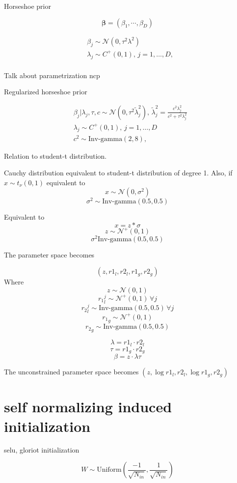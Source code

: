\documentclass[]{report}
\begin{document}
Horseshoe prior \cite{piironen2017sparsity}

\[ \mathbf{\beta} = (\beta_1,\cdots,\beta_D)\]

\begin{align*}
 &\beta_j \sim \mathcal{N}(0,\tau^2\lambda^2) \\
 &\lambda_j \sim C^+(0,1),\, j = 1,\dots , D, \\
\end{align*}

Talk about parametrization ncp 

Regularized horseshoe prior 

\begin{align*}
&\beta_j | \lambda_j, \tau, c \sim \mathcal{N}(0,\tau^2 \tilde{\lambda}_j^2) ,\, \tilde{\lambda}_j^2 = \frac{c^2 \lambda_j^2}{c^2 + \tau^2 \lambda_j^2} \\
&\lambda_j \sim C^+(0,1),\, j = 1,\dots,D\\
&c^2 \sim \text{Inv-gamma}(2,8) ,
\end{align*}

Relation to student-t distribution. 

Cauchy distribution equivalent to student-t distribution of degree 1. Also, if $x \sim t_{\nu}(0,1) $ 
equivalent to 
\[ x \sim \mathcal{N}(0,\sigma^2)\]
\[\sigma^2 \sim \text{Inv-gamma}(0.5,0.5) \]

Equivalent to 
\[ x = z * \sigma \]
\[ z \sim \mathcal{N}^+(0,1)\]
\[\sigma^2 \text{Inv-gamma}(0.5,0.5) \]

The parameter space becomes 

\[(z,r1_l,r2_l,r1_g,r2_g) \]
Where
\[ z \sim \mathcal{N}(0,1) \]
\[ {r_1}_l^j \sim \mathcal{N}^+(0,1) \, \forall j \]
\[ {r_2}_l^j \sim \text{Inv-gamma}(0.5,0.5) \, \forall j  \]
\[ {r_1}_g \sim \mathcal{N}^+(0,1)  \]
\[ {r_2}_g \sim \text{Inv-gamma}(0.5,0.5)   \]

\[ \lambda =  {r1}_l \cdot {r2}_l \]
\[ \tau = r1_g \cdot r2_g \]
\[\beta = z \cdot \lambda \tau \]

The unconstrained parameter space becomes $(z,\log r1_l,r2_l,\log r1_g,r2_g)$

\section{self normalizing induced initialization}
selu, gloriot initialization

\[ W \sim \text{Uniform}(\frac{-1}{\sqrt{N_{in}}},\frac{1}{\sqrt{N_{in}}}) \]
\end{document}
